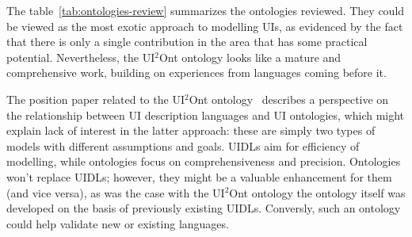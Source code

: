 The table~\ref{tab:ontologies-review} summarizes the ontologies reviewed.
They could be viewed as the most exotic approach to modelling UIs, as evidenced by the fact that there is only a single contribution in the area that has some practical potential.
Nevertheless, the UI$^{2}$Ont ontology looks like a mature and comprehensive work, building on experiences from languages coming before it.

The position paper related to the UI$^{2}$Ont ontology~\cite{paulheim_formal_2011} describes a perspective on the relationship between UI description languages and UI ontologies, which might explain lack of interest in the latter approach:
these are simply two types of models with different assumptions and goals.
UIDLs aim for efficiency of modelling, while ontologies focus on comprehensiveness and precision.
Ontologies won't replace UIDLs; however, they might be a valuable enhancement for them (and vice versa), as was the case with the UI$^{2}$Ont ontology\,\textemdash\,the ontology itself was developed on the basis of previously existing UIDLs.
Conversly, such an ontology could help validate new or existing languages.
